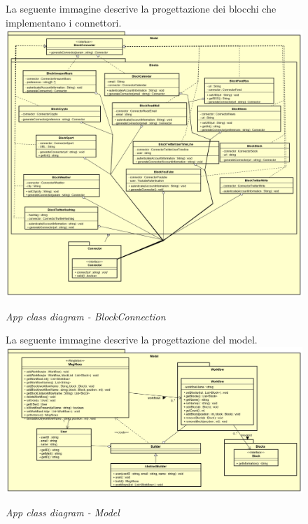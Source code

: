 \begin{figure} [H]
La seguente immagine descrive la progettazione dei blocchi che implementano i connettori.
	\centering
	\includegraphics[scale=0.3]{./images/BlockConnection.png}
	\caption{\textit{App class diagram - BlockConnection}}\label{BlockConnection}
\end{figure}

\begin{figure} [H]
La seguente immagine descrive la progettazione del model.
	\centering
	\includegraphics[scale=0.3]{./images/Model.png}
	\caption{\textit{App class diagram - Model}}\label{Model}
\end{figure}
